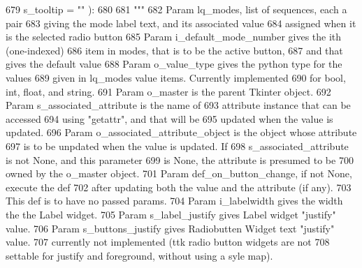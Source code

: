 \begin{DoxyCode}
679             s\_tooltip = \textcolor{stringliteral}{""} ):
680 
681         \textcolor{stringliteral}{"""}
682 \textcolor{stringliteral}{        Param lq\_modes, list of sequences, each a pair}
683 \textcolor{stringliteral}{            giving the mode label text, and its associated value}
684 \textcolor{stringliteral}{            assigned when it is the selected radio button}
685 \textcolor{stringliteral}{        Param i\_default\_mode\_number gives the ith (one-indexed)}
686 \textcolor{stringliteral}{            item in modes, that is to be the active button,}
687 \textcolor{stringliteral}{            and that gives the default value}
688 \textcolor{stringliteral}{        Param o\_value\_type gives the python type for the values}
689 \textcolor{stringliteral}{            given in lq\_modes value items.  Currently implemented}
690 \textcolor{stringliteral}{            for bool, int, float, and string.}
691 \textcolor{stringliteral}{        Param o\_master is the parent Tkinter object.}
692 \textcolor{stringliteral}{                Param s\_associated\_attribute is the name of }
693 \textcolor{stringliteral}{            attribute instance that can be accessed}
694 \textcolor{stringliteral}{            using "getattr", and that will be}
695 \textcolor{stringliteral}{            updated when the value is updated.}
696 \textcolor{stringliteral}{        Param o\_associated\_attribute\_object is the object whose attribute}
697 \textcolor{stringliteral}{            is to be unpdated when the value is updated.  If}
698 \textcolor{stringliteral}{            s\_associated\_attribute is not None, and this parameter}
699 \textcolor{stringliteral}{            is None, the attribute is presumed to be}
700 \textcolor{stringliteral}{            owned by the o\_master object.}
701 \textcolor{stringliteral}{        Param def\_on\_button\_change, if not None, execute the def}
702 \textcolor{stringliteral}{            after updating both the value and the attribute (if any).}
703 \textcolor{stringliteral}{            This def is to have no passed params.}
704 \textcolor{stringliteral}{        Param i\_labelwidth gives the width the the Label widget.}
705 \textcolor{stringliteral}{        Param s\_label\_justify gives Label widget "justify" value.}
706 \textcolor{stringliteral}{        Param s\_buttons\_justify gives Radiobutten Widget text "justify" value.}
707 \textcolor{stringliteral}{                currently not implemented (ttk radio button widgets are not}
708 \textcolor{stringliteral}{                settable for justify and foreground, without using a syle map).}

\end{DoxyCode}
